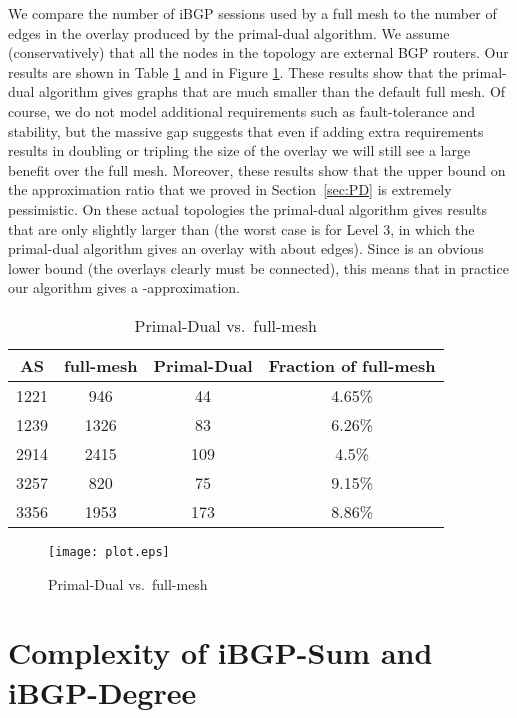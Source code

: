 \documentclass[11pt,letterpaper]{article}
\theoremstyle{definition}
\begin{document}
We compare the number of iBGP sessions used by a full mesh to the
number of edges in the overlay produced by the primal-dual algorithm.
We assume (conservatively) that all the nodes in the topology are
external BGP routers.  Our results are shown in Table
\ref{tab:results} and in Figure \ref{fig:main}.  These results show
that the primal-dual algorithm gives graphs that are much smaller than
the default full mesh.  Of course, we do not model additional
requirements such as fault-tolerance and stability, but the massive
gap suggests that even if adding extra requirements results in
doubling or tripling the size of the overlay we will still see a large
benefit over the full mesh.  Moreover, these results show that the
 upper bound on the approximation ratio that we
proved in Section~\ref{sec:PD} is extremely pessimistic.  On these
actual topologies the primal-dual algorithm gives results that are
only slightly larger than  (the worst case is for Level 3, in which
the primal-dual algorithm gives an overlay with about 
edges).  Since  is an obvious lower bound (the overlays clearly
must be connected), this means that in practice our algorithm gives a
-approximation.

\begin{table}
\begin{center}
\begin{tabular}{|c|c|c|c|}
\hline
AS & full-mesh & Primal-Dual & Fraction of full-mesh \\
\hline
1221 & 946 & 44 & 4.65\% \\
1239 & 1326 & 83 & 6.26\% \\
2914 & 2415 & 109 & 4.5\% \\
3257 & 820 & 75 & 9.15\% \\
3356 & 1953 & 173 & 8.86\% \\
\hline
\end{tabular}
\end{center}
\caption{Primal-Dual vs.\ full-mesh}
\label{tab:results}
\end{table}

\begin{figure}
\begin{center}
\texttt{[image: plot.eps]}
\end{center}
\caption{Primal-Dual vs.\ full-mesh}
\label{fig:main}
\vspace*{-.2in}
\end{figure}




\section{Complexity of {\sc iBGP-Sum} and {\sc iBGP-Degree}} \label{sec:iBGP_hardness}
\end{document}
